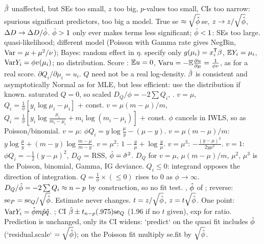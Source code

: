 \sk{} $\hat{\beta}$ unaffected, but SEs too small, $z$ too big, $p$-values too small, CIs too narrow: spurious significant predictors, too big a model. True se $\approx\sqrt{\hat{\phi}}\,$se, $z\to z/\sqrt{\hat{\phi}}$, $\Delta D\to\Delta D/\hat{\phi}$. $\hat{\phi}>1$ only ever makes terms less significant; $\hat{\phi}<1$: SEs too large.
\sk{} quasi-likelihood; different model (Poisson with Gamma rate gives NegBin, $\mathrm{Var}=\mu+\mu^2/\nu$); Bayes: random effect in $\eta$.
\sk{} specify only $g(\mu_i)=x_i^{\mathsf T}\beta$, $\mathbb{E} Y_i=\mu_i$, $\mathrm{Var} Y_i=\phi v(\mu_i)$; no distribution. Score : $\mathbb{E} u=0$, $\mathrm{Var} u=-\mathbb{E}\frac{\partial u}{\partial\mu}=\frac1{\phi v}$, as for a real score.
$\partial Q_i/\partial\mu_i=u_i$. $Q$ need not be a real log-density. $\hat{\beta}$ is consistent and asymptotically Normal as for MLE, but less efficient: use the distribution if known.
\sk{} saturated $Q=0$, so scaled $D_Q/\phi=-2\sum Q_i$, .
\sk{} $v=\mu$, $Q_i=\frac1\phi[y_i\log\mu_i-\mu_i]$ + const.  $v=\mu(m-\mu)/m$, $Q_i=\frac1\phi[y_i\log\frac{\mu_i}{m_i-\mu_i}+m_i\log(m_i-\mu_i)]$ + const. $\phi$ cancels in IWLS, so  as Poisson/binomial.
\sk{} $v=\mu$: $\phi Q_i=y\log\frac\mu y-(\mu-y)$. $v=\mu(m-\mu)/m$: $y\log\frac\mu y+(m-y)\log\frac{m-\mu}{m-y}$. $v=\mu^2$: $1-\frac y\mu+\log\frac y\mu$. $v=\mu^3$: $-\frac{(y-\mu)^2}{2y\mu^2}$.
\sk{} $v=1$: $\phi Q_i=-\frac12(y-\mu)^2$, $D_Q$ = RSS, $\hat{\phi}=\hat\sigma^2$. $D_Q$ for $v=\mu$, $\mu(m-\mu)/m$, $\mu^2$, $\mu^3$ is the Poisson, binomial, Gamma, IG deviance. $Q_i\le0$: integrand opposes the direction of integration.  $Q=\frac1\phi\times(\le0)$ rises to 0 as $\phi\to\infty$.  $D_Q/\hat{\phi}=-2\sum Q_i\approx n-p$ by construction, so no fit test.
\sk{} , $\hat{\phi}$ of ; reverse: $\mathrm{se}_P=\mathrm{se}_Q/\sqrt{\hat{\phi}}$. Estimate never changes. $t=z/\sqrt{\hat{\phi}}$, $z=t\sqrt{\hat{\phi}}$. One point: $\mathrm{Var} Y_i=\hat{\phi} m\hat p\hat q$.
\sk{} ; CI $\hat{\beta}\pm t_{n-p}(.975)\mathrm{se}_Q$ (1.96 if no $t$ given), exp for ratio. Prediction is unchanged, only its CI widens: `predict` on the quasi fit includes $\hat{\phi}$ (`residual.scale` $=\sqrt{\hat{\phi}}$); on the Poisson fit multiply se.fit by $\sqrt{\hat{\phi}}$.
